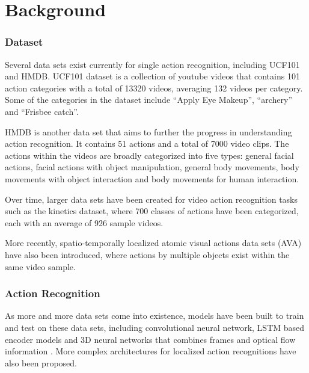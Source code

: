 \documentclass[
	a4paper, %
	10pt, %
	unnumberedsections, %
	twoside, %
]{t0004}
\begin{document}
\section{Background}

\subsubsection{Dataset} Several data sets exist currently for single action recognition, including UCF101\cite{Soomro:2012qr} and HMDB\cite{Kuehne11}. UCF101 dataset is a collection of youtube videos that contains 101 action categories with a total of 13320 videos, averaging 132 videos per category. Some of the categories in the dataset include ``Apply Eye Makeup'', ``archery'' and ``Frisbee catch''.

HMDB\cite{Kuehne11} is another data set that aims to further the progress in understanding action recognition. It contains 51 actions and a total of 7000 video clips. The actions within the videos are broadly categorized into five types: general facial actions, facial actions with object manipulation, general body movements, body movements with object interaction and body movements for human interaction.

Over time, larger data sets have been created for video action recognition tasks such as the kinetics dataset\cite{Smaira:2020qr}, where 700 classes of actions have been categorized, each with an average of 926 sample videos.

More recently, spatio-temporally localized atomic visual actions data sets (AVA)\cite{Gu:2018qr} have also been introduced, where actions by multiple objects exist within the same video sample.

\subsubsection{Action Recognition} As more and more data sets come into existence, models have been built to train and test on these data sets, including convolutional neural network, LSTM\cite{Carreira:2018qr} based encoder models and 3D neural networks that combines frames and optical flow information \cite{Carreira:2018qr}. More complex architectures for localized action recognitions have also been proposed\cite{Wu:2023qr}.
\end{document}
